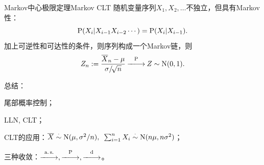 \begin{theorem}{Markov中心极限定理}{Markov CLT}
	随机变量序列$X_1,X_2,\ldots$不独立，但具有Markov性：
	\[
		\P(X_i|X_{i-1}X_{i-2}\cdots)=\P(X_i|X_{i-1}).
	\]
	加上可逆性和可达性的条件，则序列构成一个Markov链，则
	\begin{equation}
		\label{eq:Markov CLT}
		Z_n:=\frac{\avg X_n-\mu}{\sigma/\!\sqrt n}\pto Z\sim\Norm(0,1).
	\end{equation}
\end{theorem}

\begin{remark}
	总结：
	\begin{compactenum}
		\item 尾部概率控制；
		\item LLN, CLT；
		\item CLT的应用：$\avg X\dotsim\Norm(\mu,\sigma^2/n),\enspace\sum\nolimits_{i=1}^nX_i\dotsim\Norm(n\mu,n\sigma^2)$；
		\item 三种收敛：$\asto,\pto,\dto$。
	\end{compactenum}
\end{remark}
